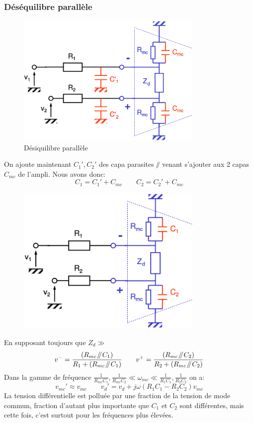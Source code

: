 \subsubsection{Déséquilibre parallèle}
\begin{figure}[H] 
	\centering 
	\includegraphics[width=0.8\textwidth,height=10\baselineskip,keepaspectratio]{ch3/image18} 
	\caption{Désiquilibre parallèle} 
\end{figure}
On ajoute maintenant \(C_1', C_2'\) des capa parasites \(\parallelsum\) venant s'ajouter aux 2 capas \(C_{mc}\) de l'ampli. Nous avons donc:
\[C_1=C_1'+C_{mc}\qquad C_2=C_2'+C_{mc}\] 
\begin{figure}[H] 
	\centering 
	\includegraphics[width=0.8\textwidth,height=10\baselineskip,keepaspectratio]{ch3/image19}
\end{figure}
En supposant toujours que \(Z_d\gg\)
\[v^-=\frac{(R_{mc} \parallelsum C_1)}{R_1+(R_{mc} \parallelsum C_1)}\qquad v^+=\frac{(R_{mc} \parallelsum C_2)}{R_2+(R_{mc} \parallelsum C_2)}\] 
Dans la gamme de fréquence \(\frac{1}{R_{mc}C_1},\frac{1}{R_{mc}C_2}\ll\omega_{mc}\ll\frac{1}{R_1C_1},\frac{1}{R_2C_2}\) on a:
\[v_{mc}'\approx v_{mc}\qquad v_d'=v_d+j\omega(R_1C_1-R_2C_2)v_{mc}\]
La tension différentielle est polluée par une fraction de la tension de mode commun, fraction d'autant plus importante que \(C_1\text{ et }C_2\) sont différentes, mais cette fois, c'est surtout pour les fréquences plus élevées.\bigbreak

